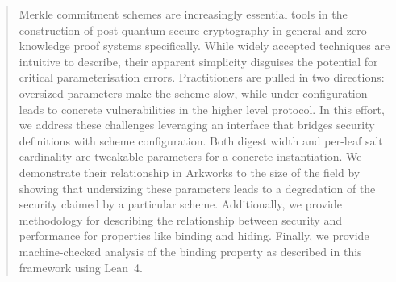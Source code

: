 \documentclass[10pt]{article}
\begin{document}
\makereporttitle

\begin{abstract}
Merkle commitment schemes are increasingly essential tools in the construction
of post quantum secure cryptography in general and zero knowledge proof systems
specifically. While widely accepted techniques are intuitive to describe, their
apparent simplicity disguises the potential for critical parameterisation errors.
Practitioners are pulled in two directions: oversized parameters make the scheme
slow, while under configuration leads to concrete vulnerabilities in the higher
level protocol. In this effort, we address these challenges leveraging an interface
that bridges security definitions with scheme configuration. Both digest width
and per-leaf salt cardinality are tweakable parameters for a concrete instantiation.
We demonstrate their relationship in Arkworks to the size of the field by showing that
undersizing these parameters leads to a degredation of the security claimed by a
particular scheme. Additionally, we provide methodology for describing the relationship
between security and performance for properties like binding and hiding. Finally, we
provide machine-checked analysis of the binding property as described in this framework
using Lean~4.
\end{abstract}









\appendix


\begingroup
\footnotesize
\makeatletter
\renewcommand\section{\@startsection{section}{1}{\z@}%
  {-0.8ex \@plus -0.3ex}{0.4ex}{\normalfont\large\bfseries}}
\makeatother


\endgroup
\end{document}

